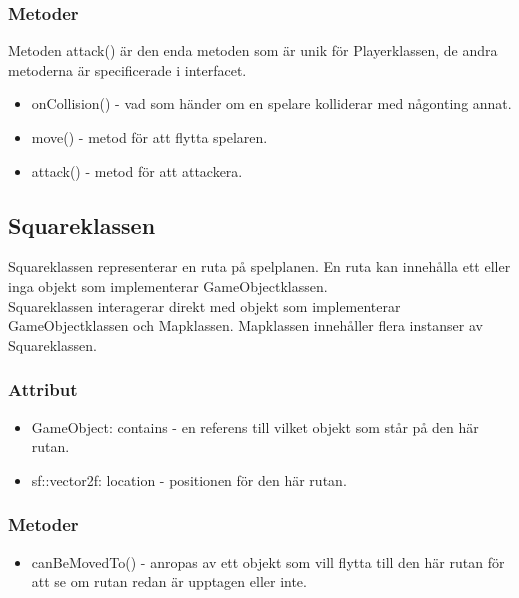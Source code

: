 \documentclass{TDP005mall}
\begin{document}
\subsubsection{Metoder}
Metoden attack() är den enda metoden som är unik för Playerklassen, de andra metoderna är specificerade i interfacet.
\begin{itemize}
  \item onCollision() - vad som händer om en spelare kolliderar med någonting annat.
  \item move() - metod för att flytta spelaren.
  \item attack() - metod för att attackera.
\end{itemize}

\newpage

\subsection{Squareklassen}
Squareklassen representerar en ruta på spelplanen. En ruta kan innehålla ett eller inga objekt som implementerar GameObjectklassen. \\
Squareklassen interagerar direkt med objekt som implementerar GameObjectklassen och Mapklassen. Mapklassen innehåller flera instanser av Squareklassen. \\
\subsubsection{Attribut}
\begin{itemize}
  \item GameObject: contains - en referens till vilket objekt som står på den här rutan.
  \item sf::vector2f: location - positionen för den här rutan.
\end{itemize}
\subsubsection{Metoder}
\begin{itemize}
  \item canBeMovedTo() - anropas av ett objekt som vill flytta till den här rutan för att se om rutan redan är upptagen eller inte.
\end{itemize}
\end{document}

